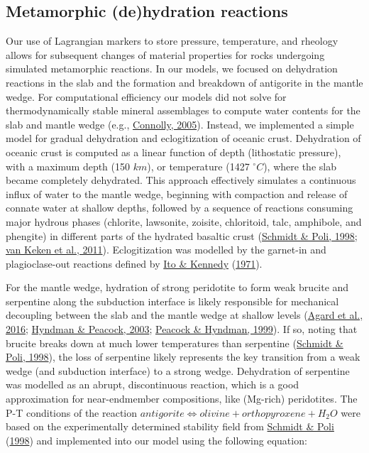 \documentclass[draft,linenumbers]{agujournal2018}
\begin{document}
\hypertarget{metamorphic-dehydration-reactions}{%
\subsection{Metamorphic (de)hydration
reactions}\label{metamorphic-dehydration-reactions}}

Our use of Lagrangian markers to store pressure, temperature, and
rheology allows for subsequent changes of material properties for rocks
undergoing simulated metamorphic reactions. In our models, we focused on
dehydration reactions in the slab and the formation and breakdown of
antigorite in the mantle wedge. For computational efficiency our models
did not solve for thermodynamically stable mineral assemblages to
compute water contents for the slab and mantle wedge (e.g.,
\protect\hyperlink{ref-Connolly2005}{Connolly, 2005}). Instead, we
implemented a simple model for gradual dehydration and eclogitization of
oceanic crust. Dehydration of oceanic crust is computed as a linear
function of depth (lithostatic pressure), with a maximum depth (150
\(km\)), or temperature (1427 \(^\circ C\)), where the slab became
completely dehydrated. This approach effectively simulates a continuous
influx of water to the mantle wedge, beginning with compaction and
release of connate water at shallow depths, followed by a sequence of
reactions consuming major hydrous phases (chlorite, lawsonite, zoisite,
chloritoid, talc, amphibole, and phengite) in different parts of the
hydrated basaltic crust (\protect\hyperlink{ref-Schmidt1998}{Schmidt \&
Poli, 1998}; \protect\hyperlink{ref-VanKeken2011}{van Keken et al.,
2011}). Eclogitization was modelled by the garnet-in and plagioclase-out
reactions defined by \protect\hyperlink{ref-Ito1971}{Ito \& Kennedy}
(\protect\hyperlink{ref-Ito1971}{1971}).

For the mantle wedge, hydration of strong peridotite to form weak
brucite and serpentine along the subduction interface is likely
responsible for mechanical decoupling between the slab and the mantle
wedge at shallow levels (\protect\hyperlink{ref-Agard2016}{Agard et al.,
2016}; \protect\hyperlink{ref-Hyndman2003}{Hyndman \& Peacock, 2003};
\protect\hyperlink{ref-Peacock1999a}{Peacock \& Hyndman, 1999}). If so,
noting that brucite breaks down at much lower temperatures than
serpentine (\protect\hyperlink{ref-Schmidt1998}{Schmidt \& Poli, 1998}),
the loss of serpentine likely represents the key transition from a weak
wedge (and subduction interface) to a strong wedge. Dehydration of
serpentine was modelled as an abrupt, discontinuous reaction, which is a
good approximation for near-endmember compositions, like (Mg-rich)
peridotites. The P-T conditions of the reaction
\(antigorite \Leftrightarrow olivine + orthopyroxene + H_{2}O\) were
based on the experimentally determined stability field from
\protect\hyperlink{ref-Schmidt1998}{Schmidt \& Poli}
(\protect\hyperlink{ref-Schmidt1998}{1998}) and implemented into our
model using the following equation:
\end{document}
